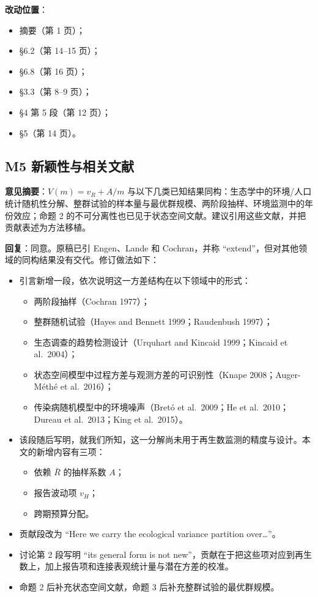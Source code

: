 \documentclass[UTF8,a4paper,11pt,fontset=none]{ctexart}
\providecommand{\tightlist}{\setlength{\itemsep}{1pt}\setlength{\parskip}{0pt}}
\begin{document}
\textbf{改动位置}：

\begin{itemize}
\tightlist
\item
  摘要（第 1 页）；
\item
  §6.2（第 14--15 页）；
\item
  §6.8（第 16 页）；
\item
  §3.3（第 8--9 页）；
\item
  §4 第 5 段（第 12 页）；
\item
  §5（第 14 页）。
\end{itemize}

\subsection*{M5 新颖性与相关文献}

\textbf{意见摘要}：\(V(m)=v_R+A/m\) 与以下几类已知结果同构：生态学中的环境/人口统计随机性分解、整群试验的样本量与最优群规模、两阶段抽样、环境监测中的年份效应；命题 2 的不可分离性也已见于状态空间文献。建议引用这些文献，并把贡献表述为方法移植。

\textbf{回复}：同意。原稿已引 Engen、Lande 和 Cochran，并称 ``extend''，但对其他领域的同构结果没有交代。修订做法如下：

\begin{itemize}
\tightlist
\item
  引言新增一段，依次说明这一方差结构在以下领域中的形式：

  \begin{itemize}
  \tightlist
  \item
    两阶段抽样（Cochran 1977）；
  \item
    整群随机试验（Hayes and Bennett 1999；Raudenbush 1997）；
  \item
    生态调查的趋势检测设计（Urquhart and Kincaid 1999；Kincaid et al.~2004）；
  \item
    状态空间模型中过程方差与观测方差的可识别性（Knape 2008；Auger-Méthé et al.~2016）；
  \item
    传染病随机模型中的环境噪声（Bretó et al.~2009；He et al.~2010；Dureau et al.~2013；King et al.~2015）。
  \end{itemize}
\item
  该段随后写明，就我们所知，这一分解尚未用于再生数监测的精度与设计。本文的新增内容有三项：

  \begin{itemize}
  \tightlist
  \item
    依赖 \(\bar R\) 的抽样系数 \(A\)；
  \item
    报告波动项 \(v_H\)；
  \item
    跨期预算分配。
  \end{itemize}
\item
  贡献段改为 ``Here we carry the ecological variance partition over\ldots{}''。
\item
  讨论第 2 段写明 ``its general form is not new''，贡献在于把这些项对应到再生数上，加上报告项和连接表观统计量与潜在方差的校准。
\item
  命题 2 后补充状态空间文献，命题 3 后补充整群试验的最优群规模。
\end{itemize}
\end{document}
